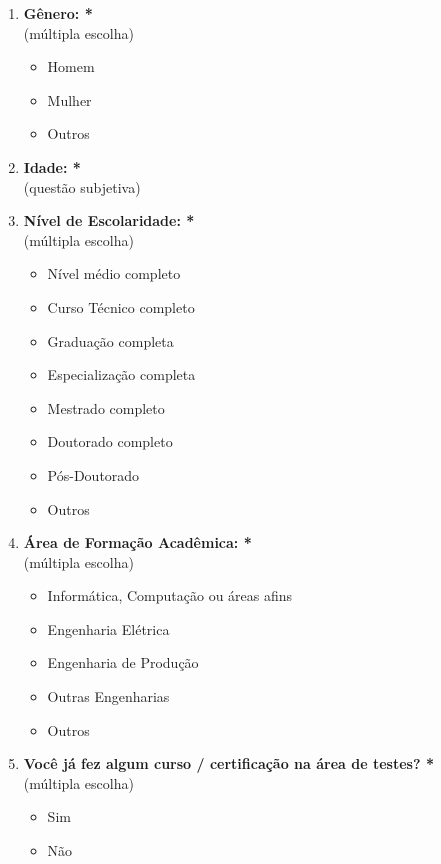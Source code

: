 \begin{enumerate}[label=\bf A\arabic*,leftmargin=1.8cm]
\begin{enumerate}[label= \arabic*]
        \item \textbf{Gênero: *}\\
        (múltipla escolha)
        \begin{itemize}
            \item Homem
            \item Mulher
            \item Outros
        \end{itemize}
        
        \item \textbf{Idade: *}\\
        (questão subjetiva)
        
        \item \textbf{Nível de Escolaridade: *}\\
        (múltipla escolha)
        \begin{itemize}
            \item Nível médio completo
            \item Curso Técnico completo
            \item Graduação completa
            \item Especialização completa
            \item Mestrado completo
            \item Doutorado completo
            \item Pós-Doutorado
            \item Outros
        \end{itemize}
        
        \item \textbf{Área de Formação Acadêmica: *}\\
        (múltipla escolha)
        \begin{itemize}
            \item Informática, Computação ou áreas afins
            \item Engenharia Elétrica
            \item Engenharia de Produção
            \item Outras Engenharias
            \item Outros
        \end{itemize}
        
        \item \textbf{Você já fez algum curso / certificação na área de testes? *}\\
        (múltipla escolha)
        \begin{itemize}
            \item Sim
            \item Não
        \end{itemize}
        

\end{enumerate}
\end{enumerate}
